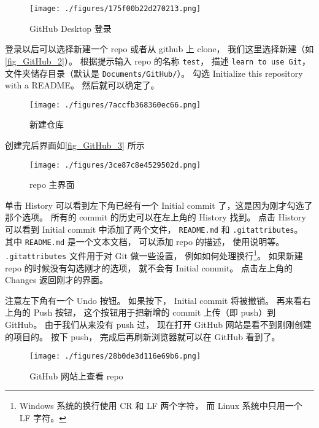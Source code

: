 \begin{figure}[ht]
\centering
\texttt{[image: ./figures/175f00b22d270213.png]}
\caption{GitHub Desktop 登录} \label{fig_GitHub_1}
\end{figure}

登录以后可以选择新建一个 repo 或者从 github 上 clone， 我们这里选择新建（如\autoref{fig_GitHub_2}）。 根据提示输入 repo 的名称 \verb`test`， 描述 \verb`learn to use Git`， 文件夹储存目录（默认是 \verb`Documents/GitHub/`）。 勾选 Initialize this repository with a README。 然后就可以确定了。

\begin{figure}[ht]
\centering
\texttt{[image: ./figures/7accfb368360ec66.png]}
\caption{新建仓库} \label{fig_GitHub_2}
\end{figure}

创建完后界面如\autoref{fig_GitHub_3} 所示
\begin{figure}[ht]
\centering
\texttt{[image: ./figures/3ce87c8e4529502d.png]}
\caption{repo 主界面} \label{fig_GitHub_3}
\end{figure}

单击 History 可以看到左下角已经有一个 Initial commit 了，这是因为刚才勾选了那个选项。 所有的 commit 的历史可以在左上角的 History 找到。 点击 History 可以看到 Initial commit 中添加了两个文件， \verb`README.md` 和 \verb`.gitattributes`。 其中 \verb`README.md` 是一个文本文档， 可以添加 repo 的描述， 使用说明等。 \verb`.gitattributes` 文件用于对 Git 做一些设置， 例如如何处理换行\footnote{Windows 系统的换行使用 CR 和 LF 两个字符， 而 Linux 系统中只用一个 LF 字符。}。 如果新建 repo 的时候没有勾选刚才的选项， 就不会有 Initial commit。 点击左上角的 Changes 返回刚才的界面。

注意左下角有一个 Undo 按钮。 如果按下， Initial commit 将被撤销。 再来看右上角的 Push 按钮， 这个按钮用于把新增的 commit 上传（即 push）到 GitHub。 由于我们从来没有 push 过， 现在打开 GitHub 网站是看不到刚刚创建的项目的。 按下 push， 完成后再刷新浏览器就可以在 GitHub 看到了。
\begin{figure}[ht]
\centering
\texttt{[image: ./figures/28b0de3d116e69b6.png]}
\caption{GitHub 网站上查看 repo} \label{fig_GitHub_5}
\end{figure}


